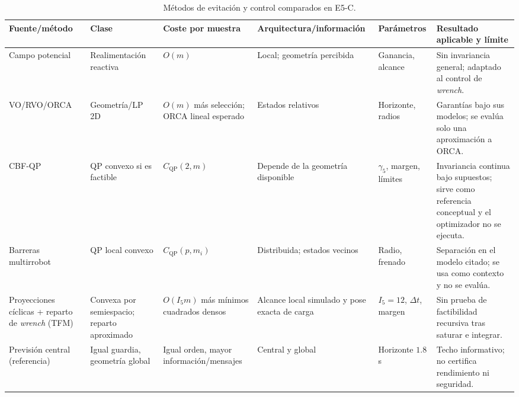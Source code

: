 \begin{table}[!htbp]
  \centering
  \caption{Métodos de evitación y control comparados en E5-C.}
  \label{tab:sp5-methods}
  \viutablefont
  \setlength{\tabcolsep}{1.4pt}
  \renewcommand{\arraystretch}{1.05}
  \begin{tabularx}{\textwidth}{>{\raggedright\arraybackslash}p{2.15cm} >{\raggedright\arraybackslash}p{1.45cm} >{\raggedright\arraybackslash}p{2.15cm} >{\raggedright\arraybackslash}p{2.05cm} >{\raggedright\arraybackslash}p{1.80cm} Y}
    \toprule
    Fuente/método & Clase & Coste por muestra & Arquitectura/información & Parámetros & Resultado aplicable y límite \\
    \midrule
    Campo potencial \parencite{khatib1986obstacle} & Realimentación reactiva & $O(m)$ & Local; geometría percibida & Ganancia, alcance & Sin invariancia general; adaptado al control de \emph{wrench}. \\
    VO/RVO/ORCA \parencite{fiorini1998velocity,vandenberg2008rvo,vandenberg2011orca} & Geometría/LP 2D & $O(m)$ más selección; ORCA lineal esperado & Estados relativos & Horizonte, radios & Garantías bajo sus modelos; se evalúa solo una aproximación a ORCA. \\
    CBF-QP \parencite{ames2017cbf} & QP convexo si es factible & $C_{\mathrm{QP}}(2,m)$ & Depende de la geometría disponible & $\gamma_5$, margen, límites & Invariancia continua bajo supuestos; sirve como referencia conceptual y el optimizador no se ejecuta. \\
    Barreras multirrobot \parencite{wang2017barrier} & QP local convexo & $C_{\mathrm{QP}}(p,m_i)$ & Distribuida; estados vecinos & Radio, frenado & Separación en el modelo citado; se usa como contexto y no se evalúa. \\
    Proyecciones cíclicas + reparto de \emph{wrench} (TFM) & Convexa por semiespacio; reparto aproximado & $O(I_5m)$ más mínimos cuadrados densos & Alcance local simulado y pose exacta de carga & $I_5=12$, $\Delta t$, margen & Sin prueba de factibilidad recursiva tras saturar e integrar. \\
    Previsión central (referencia) & Igual guardia, geometría global & Igual orden, mayor información/mensajes & Central y global & Horizonte $1.8$ s & Techo informativo; no certifica rendimiento ni seguridad. \\
    \bottomrule
  \end{tabularx}
\end{table}

